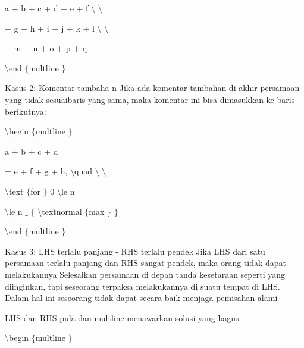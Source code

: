\noindent 
a + b + c + d + e + f  $  \setminus  $ $  \setminus  $ \par
\vspace{12pt}
\noindent 
+ g + h + i + j + k + l  $  \setminus  $ $  \setminus  $ \par
\vspace{12pt}
\noindent 
+ m + n + o + p + q \par
\vspace{12pt}
\noindent 
 $  \setminus  $end $  \{  $multline $  \}  $ \par
\vspace{12pt}
\noindent 
Kasus 2: Komentar tambaha n Jika ada komentar tambahan di akhir persamaan yang tidak sesuaibaris yang sama, maka komentar ini bisa dimasukkan ke baris berikutnya: \par
\vspace{12pt}
\noindent 
 $  \setminus  $begin $  \{  $multline $  \}  $ \par
\noindent 
a + b + c + d \par
\vspace{12pt}
\noindent 
= e + f + g + h,  $  \setminus  $quad  $  \setminus  $ $  \setminus  $ \par
\vspace{12pt}
\noindent 
 $  \setminus  $text $  \{  $for  $  \}  $ 0  $  \setminus  $le n \par
\vspace{12pt}
\noindent 
 $  \setminus  $le n $  \_  $ $  \{  $ $  \setminus  $textnormal $  \{  $max $  \}  $ $  \}  $ \par
\vspace{12pt}
\noindent 
 $  \setminus  $end $  \{  $multline $  \}  $ \par
\vspace{12pt}
\vspace{16pt}
\noindent 
Kasus 3: LHS terlalu panjang - RHS terlalu pendek Jika LHS dari satu persamaan terlalu panjang dan RHS sangat pendek, maka orang tidak dapat melakukannya Selesaikan persamaan di depan tanda kesetaraan seperti yang diinginkan, tapi seseorang terpaksa melakukannya di suatu tempat di LHS. Dalam hal ini seseorang tidak dapat secara baik menjaga pemisahan alami \par
\noindent 
LHS dan RHS pula dan multline menawarkan solusi yang bagus: \par
\vspace{12pt}
\vspace{12pt}
\noindent 
 $  \setminus  $begin $  \{  $multline $  \}  $ \par
